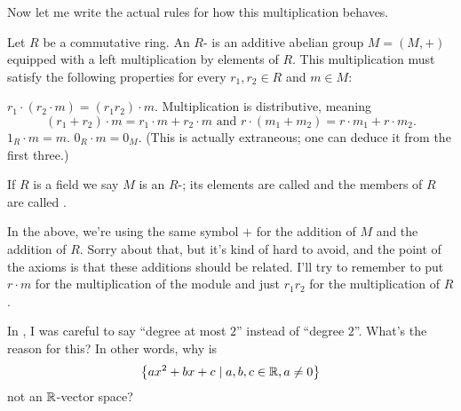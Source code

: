 Now let me write the actual rules for how this multiplication behaves.
\begin{definition}
	Let $R$ be a commutative ring.
	An $R$- is an additive abelian group
	$M = (M,+)$ equipped with a left multiplication by elements of $R$.
	This multiplication must satisfy the following properties
	for every $r_1, r_2 \in R$ and $m \in M$:
	\begin{enumerate}[(i)]
		\ii $r_1 \cdot (r_2 \cdot m) = (r_1r_2) \cdot m$.
		\ii Multiplication is distributive, meaning
		\[ (r_1+r_2) \cdot m = r_1 \cdot m + r_2 \cdot m 
			\text{ and }
			r \cdot (m_1 + m_2) = r \cdot m_1 + r \cdot m_2. \]
		\ii $1_R \cdot m = m$.
		\ii $0_R \cdot m = 0_M$. (This is actually extraneous;
		one can deduce it from the first three.)
	\end{enumerate}
	If $R$ is a field we say $M$ is an $R$-;
	its elements are called 
	and the members of $R$ are called .
\end{definition}

\begin{abuse}
	In the above, we're using the same symbol $+$ for the addition of $M$
	and the addition of $R$.
	Sorry about that, but it's kind of hard to avoid, and the point
	of the axioms is that these additions should be related.
	I'll try to remember to put $r \cdot m$ for the multiplication of the module
	and just $r_1r_2$ for the multiplication of $R$.
\end{abuse}

\begin{ques}
	In ,
	I was careful to say ``degree at most $2$'' instead of ``degree $2$''.
	What's the reason for this?
	In other words, why is
	\[ \left\{ ax^2 + bx + c \mid a,b,c \in \mathbb R, a \neq 0  \right\} \]
	not an $\mathbb R$-vector space?
\end{ques}

